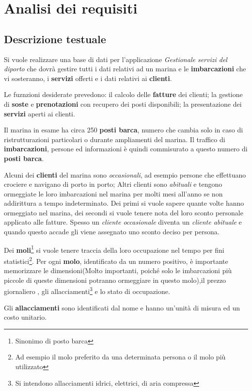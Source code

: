 
\section{Analisi dei requisiti}
\subsection{Descrizione testuale}
Si vuole realizzare una base di dati per l'applicazione \textit{Gestionale servizi del diporto} che dovrà gestire tutti i dati relativi ad un marina e le \textbf{imbarcazioni} che vi sosteranno, i \textbf{servizi} offerti e i dati relativi ai \textbf{clienti}.

Le fuznzioni desiderate prevedono: il calcolo delle \textbf{fatture} dei clienti; la gestione di \textbf{soste} e \textbf{prenotazioni} con recupero dei posti disponibili; la presentazione dei \textbf{servizi} aperti ai clienti.

Il marina in esame ha circa 250 \textbf{posti barca}, numero che cambia solo in caso di ristrutturazioni particolari o durante ampliamenti del marina. Il traffico di \textbf{imbarcazioni}, persone ed informazioni è quindi commisurato a questo numero di \textbf{posti barca}.

Alcuni dei \textbf{clienti} del marina sono \textit{occasionali}, ad esempio persone che effettuano crociere e navigano di porto in porto; Altri clienti sono \textit{abituali} e tengono ormeggiate le loro imbarcazioni nel marina per molti mesi all'anno se non addirittura a tempo indeterminato. Dei primi si vuole sapere quante volte hanno ormeggiato nel marina, dei secondi si vuole tenere nota del loro sconto personale applicato alle fatture. Spesso un \textit{cliente occasionale} diventa un \textit{cliente abituale} e quando questo accade gli viene assegnato uno sconto deciso per persona.

Dei \textbf{moli}\footnote{Sinonimo di posto barca} si vuole tenere traccia della loro occupazione nel tempo per fini statistici\footnote{Ad esempio il molo preferito da una determinata persona o il molo più utilizzato}. Per ogni \textbf{molo}, identificato da un numero positivo, è importante memorizzare le dimensioni(Molto importanti, poiché solo le imbarcazioni più piccole di queste dimensioni potranno ormeggiare in questo molo),il prezzo giornaliero , gli allacciamenti\footnote{Si intendono allacciamenti idrici, elettrici, di aria compressa} e lo stato di occupazione.

Gli \textbf{allacciamenti} sono identificati dal nome e hanno un'unità di misura ed un costo unitario.

